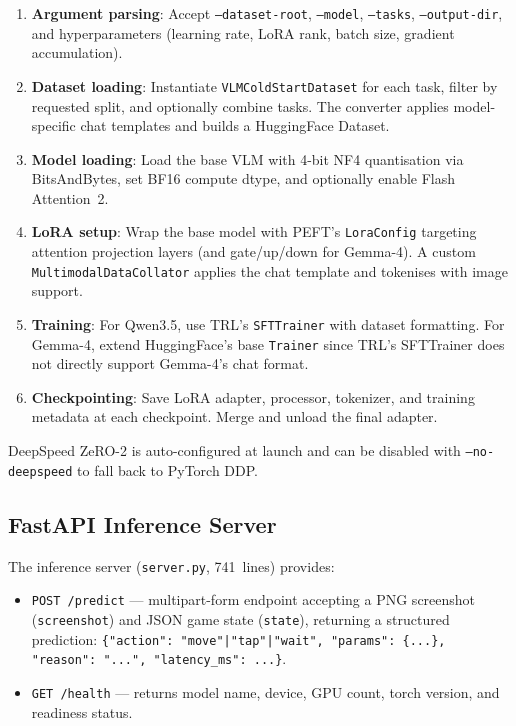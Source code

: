 \documentclass[11pt,a4paper]{article}
\begin{document}
\begin{enumerate}[leftmargin=*,itemsep=2pt]
  \item \textbf{Argument parsing}: Accept \texttt{--dataset-root}, \texttt{--model}, \texttt{--tasks}, \texttt{--output-dir}, and hyperparameters (learning rate, LoRA rank, batch size, gradient accumulation).
  \item \textbf{Dataset loading}: Instantiate \texttt{VLMColdStartDataset} for each task, filter by requested split, and optionally combine tasks. The converter applies model-specific chat templates and builds a HuggingFace Dataset.
  \item \textbf{Model loading}: Load the base VLM with 4-bit NF4 quantisation via BitsAndBytes, set BF16 compute dtype, and optionally enable Flash Attention~2.
  \item \textbf{LoRA setup}: Wrap the base model with PEFT's \texttt{LoraConfig} targeting attention projection layers (and gate/up/down for Gemma-4). A custom \texttt{MultimodalDataCollator} applies the chat template and tokenises with image support.
  \item \textbf{Training}: For Qwen3.5, use TRL's \texttt{SFTTrainer} with dataset formatting. For Gemma-4, extend HuggingFace's base \texttt{Trainer} since TRL's SFTTrainer does not directly support Gemma-4's chat format.
  \item \textbf{Checkpointing}: Save LoRA adapter, processor, tokenizer, and training metadata at each checkpoint. Merge and unload the final adapter.
\end{enumerate}

DeepSpeed ZeRO-2 is auto-configured at launch and can be disabled with \texttt{--no-deepspeed} to fall back to PyTorch DDP.

\subsection{FastAPI Inference Server}

The inference server (\texttt{server.py}, 741~lines) provides:

\begin{itemize}[leftmargin=*,itemsep=2pt]
  \item \texttt{POST /predict} — multipart-form endpoint accepting a PNG screenshot (\texttt{screenshot}) and JSON game state (\texttt{state}), returning a structured prediction: \texttt{\{"action": "move"|"tap"|"wait", "params": \{...\}, "reason": "...", "latency\_ms": ...\}}.
  \item \texttt{GET /health} — returns model name, device, GPU count, torch version, and readiness status.
\end{itemize}
\end{document}
